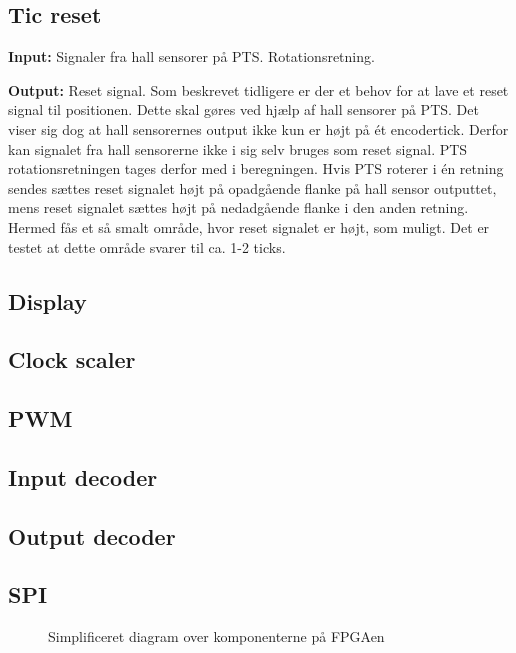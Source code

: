 \subsection*{Tic reset}
\textbf{Input:} Signaler fra hall sensorer på PTS. Rotationsretning.

\textbf{Output:} Reset signal.
Som beskrevet tidligere er der et behov for at lave et reset signal til positionen. 
Dette skal gøres ved hjælp af hall sensorer på PTS. 
Det viser sig dog at hall sensorernes output ikke kun er højt på ét encodertick. 
Derfor kan signalet fra hall sensorerne ikke i sig selv bruges som reset signal.
PTS rotationsretningen tages derfor med i beregningen.
Hvis PTS roterer i én retning sendes sættes reset signalet højt på opadgående 
flanke på hall sensor outputtet, mens reset signalet sættes højt på nedadgående 
flanke i den anden retning. 
Hermed fås et så smalt område, hvor reset signalet er højt, som muligt. 
Det er testet at dette område svarer til ca. 1-2 ticks.

\subsection*{Display}

\subsection*{Clock scaler}

\subsection*{PWM}

\subsection*{Input decoder}

\subsection*{Output decoder}

\subsection*{SPI}




\begin{figure}[!th]
\centering
\begin{tikzpicture}[node distance = 5 cm,scale=1]

\end{tikzpicture}
\caption[Kom]{Simplificeret diagram over komponenterne på FPGAen}
\label{fig:FPGA_blok}
\end{figure}


